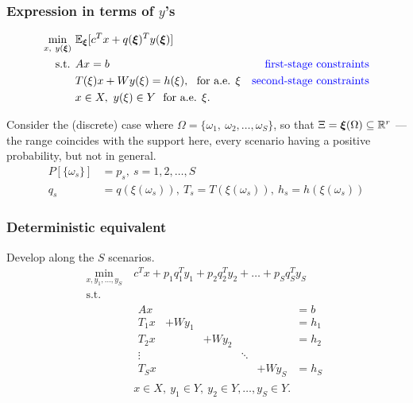 \documentclass[aspectratio=169]{beamer}
\begin{document}
\begin{frame}
	\frametitle{Expression in terms of $y$'s}
	
	\begin{align*}
	\min_{x,\ y({\boldsymbol{\xi}})}\ & {\mathbb{E}}_{{\boldsymbol{\xi}}} [ c^T x + q({\boldsymbol{\xi}})^T y({\boldsymbol{\xi}}) ] \\
	\mbox{s.t. } & Ax = b & \mbox{\textcolor{blue}{first-stage constraints}} \\
	& T(\xi)x + Wy(\xi) = h(\xi),\ \text{ for a.e. } \xi &
	\mbox{\textcolor{blue}{second-stage constraints}} \\
	& x \in X,\ y(\xi) \in Y\ \text{ for a.e. } \xi.
	\end{align*}
	
	\mbox{}
	
	Consider the (discrete) case where $\Omega = \lbrace \omega_1,\
	\omega_2,\ldots,\omega_S \rbrace$, so that $\Xi = {\boldsymbol{\xi}}(\Omega) \subseteq {\mathbb{R}}^r$ --- the range
	coincides with the support here, every scenario having a positive probability, but not in general.
	\begin{align*}
	P[\lbrace \omega_s \rbrace] & = p_s,\ s = 1, 2,\ldots, S \\
	q_s & = q(\xi(\omega_s)),\ T_s = T (\xi(\omega_s)),\ h_s = h(\xi(\omega_s))
	\end{align*}
	
\end{frame}

\begin{frame}
	\frametitle{Deterministic equivalent}
	
	Develop along the $S$ scenarios.
	\begin{align*}
	\min_{x, y_1, \ldots, y_S}\ & c^T x + p_1 q_1^T y_1 + p_2 q_2^T y_2 + \ldots
	+ p_S q_S^Ty_S \\
	\mbox{s.t. } & \\
	& \begin{matrix} Ax & & & & & = b\\
	T_1 x & + W y_1 & & & & = h_1 \\
	T_2 x & & + W y_2 & & & = h_2 \\
	\vdots & & & \ddots & \\
	T_S x & & & & + W y_S & = h_S
	\end{matrix} \\
	& x \in X,\ y_1 \in Y,\ y_2 \in Y,\ldots, y_S \in Y.
	\end{align*}
	
\end{frame}
\end{document}

